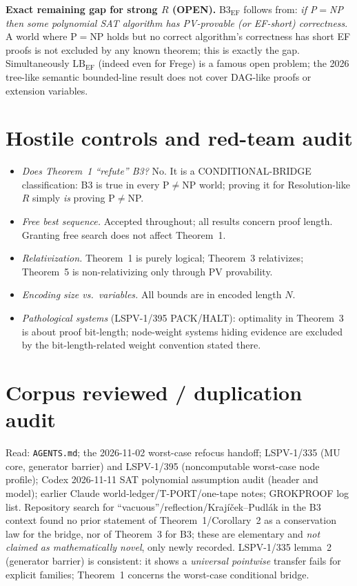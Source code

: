 \documentclass[11pt]{article}
\theoremstyle{definition}
\begin{document}
\noindent\textbf{Exact remaining gap for strong $R$ (OPEN).} B3$_{\mathrm{EF}}$
follows from: \emph{if P$=$NP then some polynomial SAT algorithm has
PV-provable (or EF-short) correctness}. A world where P$=$NP holds but no
correct algorithm's correctness has short EF proofs is not excluded by any
known theorem; this is exactly the gap. Simultaneously $\mathrm{LB}_{\mathrm{EF}}$
(indeed even for Frege) is a famous open problem; the 2026 tree-like semantic
bounded-line result does not cover DAG-like proofs or extension variables.

\section{Hostile controls and red-team audit}
\begin{itemize}
\item \emph{Does Theorem~1 ``refute'' B3?} No. It is a CONDITIONAL-BRIDGE
  classification: B3 is true in every P$\ne$NP world; proving it for
  Resolution-like $R$ simply \emph{is} proving P$\neq$NP.
\item \emph{Free best sequence.} Accepted throughout; all results concern
  proof length. Granting free search does not affect Theorem~1.
\item \emph{Relativization.} Theorem~1 is purely logical; Theorem~3 relativizes;
  Theorem~5 is non-relativizing only through PV provability.
\item \emph{Encoding size vs.\ variables.} All bounds are in encoded length $N$.
\item \emph{Pathological systems} (LSPV-1/395 PACK/HALT): optimality in
  Theorem~3 is about proof bit-length; node-weight systems hiding evidence
  are excluded by the bit-length-related weight convention stated there.
\end{itemize}

\section{Corpus reviewed / duplication audit}
Read: \texttt{AGENTS.md}; the 2026-11-02 worst-case refocus handoff;
LSPV-1/335 (MU core, generator barrier) and LSPV-1/395 (noncomputable
worst-case node profile); Codex 2026-11-11 SAT polynomial assumption audit
(header and model); earlier Claude world-ledger/T-PORT/one-tape notes;
GROKPROOF log list. Repository search for ``vacuous''/reflection/Krajíček--Pudlák
in the B3 context found no prior statement of Theorem~1/Corollary~2 as a
conservation law for the bridge, nor of Theorem~3 for B3; these are elementary
and \emph{not claimed as mathematically novel}, only newly recorded. LSPV-1/335
lemma~2 (generator barrier) is consistent: it shows a \emph{universal pointwise}
transfer fails for explicit families; Theorem~1 concerns the worst-case
conditional bridge.
\end{document}
